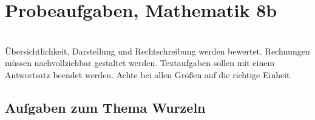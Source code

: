 \documentclass{../exam2e}
\begin{document}
\printanswers

\section*{Probeaufgaben, Mathematik 8b}

\gradetable[h][questions]\\[.5ex]

Übersichtlichkeit, Darstellung und Rechtschreibung werden bewertet.
Rechnungen müssen nach\-voll\-zieh\-bar gestaltet werden. 
Textaufgaben sollen mit einem Antwortsatz beendet werden. 
Achte bei allen Größen auf die richtige Einheit.



\subsection*{Aufgaben zum Thema Wurzeln}
\end{document}
